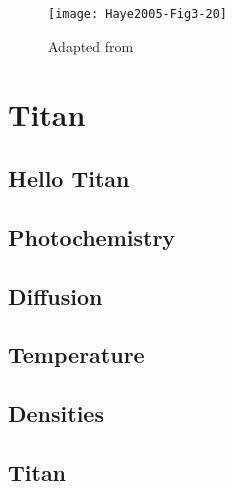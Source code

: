 \documentclass{report}
\begin{document}
\tableofcontents

\begin{figure}
\centering
\texttt{[image: Haye2005-Fig3-20]}
\caption{Adapted from \cite{Haye2005}}
\end{figure}

\part{Titan}
\chapter{Hello Titan}


\chapter{Photochemistry}


\chapter{Diffusion}


\chapter{Temperature}


\chapter{Densities}


\appendix
\chapter{Titan}

\clearpage


\end{document}
